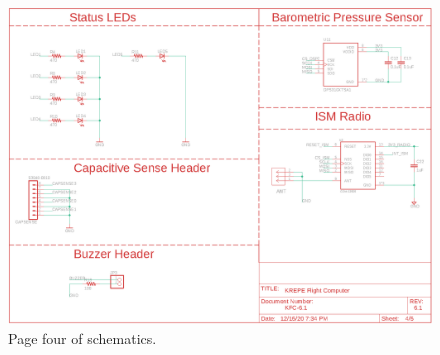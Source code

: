 \documentclass{article}
\begin{document}
\begin{figure}[H]
    \centering
    \includegraphics[width=\textwidth]{images/page4.png}
    \caption{Page four of schematics.}
    \label{fig:page1-4}
\end{figure}


\end{document}
